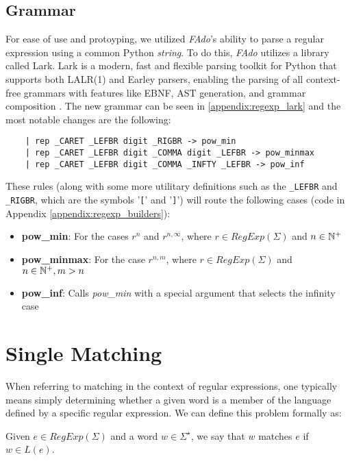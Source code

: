 \subsection{Grammar}
For ease of use and protoyping, we utilized \textit{FAdo}'s ability to parse a regular expression using a common Python \textit{string}. To do this, \textit{FAdo} utilizes a library called Lark. Lark is a modern, fast and flexible parsing toolkit for Python that supports both LALR(1) and Earley parsers, enabling the parsing of all context-free grammars with features like EBNF, AST generation, and grammar composition \cite{lark_parser}.
The new grammar can be seen in \ref{appendix:regexp_lark} and the most notable changes are the following:
\begin{lstlisting}
	| rep _CARET _LEFBR digit _RIGBR -> pow_min
	| rep _CARET _LEFBR digit _COMMA digit _LEFBR -> pow_minmax
	| rep _CARET _LEFBR digit _COMMA _INFTY _LEFBR -> pow_inf
\end{lstlisting}
These rules (along with some more utilitary definitions such as the \texttt{\_LEFBR} and \texttt{\_RIGBR}, which are the symbols '\texttt{\string[}' and '\texttt{\string]}') will route the following cases (code in Appendix \ref{appendix:regexp_builders}):
\begin{itemize}
	\item \textbf{pow\_min}: For the cases $r^{n}$ and $r^{n,\infty}$, where $r \in RegExp(\Sigma)$ and $n \in {\mathbb{N}^{+}}$
	\item \textbf{pow\_minmax}: For the case $r^{n,m}$, where $r \in RegExp(\Sigma)$ and $n \in {\mathbb{N}^{+}}, m>n$
	\item \textbf{pow\_inf}: Calls \textit{pow\_min} with a special argument that selects the infinity case
\end{itemize}

\section{Single Matching}
When referring to matching in the context of regular expressions, one typically means simply determining whether a given word is a member of the language defined by a specific regular expression.
We can define this problem formally as:
\begin{defn}
	\label{defn:single_matching}
	Given $e \in RegExp(\Sigma)$ and a word $w \in \Sigma^\star$, we say that $w$ matches $e$ if $w \in L(e)$.
\end{defn}

